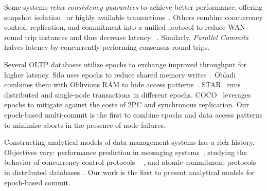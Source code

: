 Some systems
\emph{relax consistency guarantees} 
to achieve 
better performance, offering snapshot isolation~\cite{elnikety,du,sovran} or highly available 
transactions~\cite{bailis}.
Others
combine concurrency control, replication, and commitment into a unified protocol 
to reduce WAN round trip instances and thus decrease latency
~\cite{kraska,zhang,fan,mu,nawab,maiyya}.
Similarly, \emph{Parallel Commits}~\cite{taft} 
halves latency by concurrently performing
consensus round trips.

Several 
OLTP databases utilize epochs to exchange improved throughput
for higher latency.
Silo 
uses epochs to
reduce shared memory writes~\cite{tu}.
Obladi %
combines 
them with Oblivious RAM 
to hide access patterns~\cite{crooks}.
STAR~\cite{lu3} runs distributed 
and single-node transactions in different
epochs.
COCO~\cite{lu} leverages epochs to mitigate against the costs of 2PC and
synchronous replication.
Our epoch-based multi-commit is the first to combine
epochs and data access patterns to minimise aborts in the presence of node
failures.

Constructing analytical models of data management systems has a rich history.
Objectives vary: performance prediction in messaging systems~\cite{wu}, 
studying the behavior of concurrency control protocols %
~\cite{yu,agrawal,disanzo} 
, and
atomic commitment protocols in distributed 
databases~\cite{menasce,liu}.
Our work is the first to  %
present analytical models for epoch-based commit.


